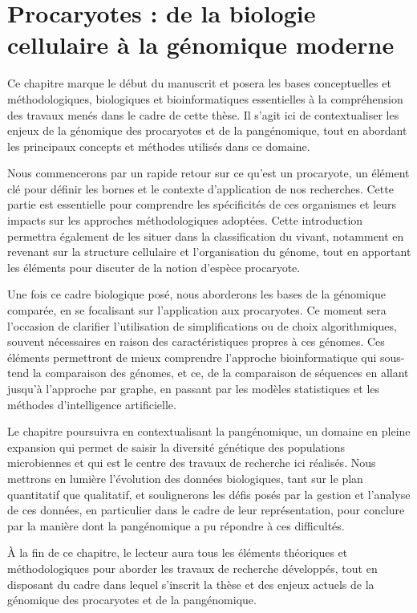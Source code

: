 \part{Procaryotes : de la biologie cellulaire à la génomique moderne}

Ce chapitre marque le début du manuscrit et posera les bases conceptuelles et méthodologiques, biologiques et bioinformatiques essentielles à la compréhension des travaux menés dans le cadre de cette thèse. Il s’agit ici de contextualiser les enjeux de la génomique des procaryotes et de la pangénomique, tout en abordant les principaux concepts et méthodes utilisés dans ce domaine.

Nous commencerons par un rapide retour sur ce qu'est un procaryote, un élément clé pour définir les bornes et le contexte d’application de nos recherches. Cette partie est essentielle pour comprendre les spécificités de ces organismes et leurs impacts sur les approches méthodologiques adoptées. Cette introduction permettra également de les situer dans la classification du vivant, notamment en revenant sur la structure cellulaire et l'organisation du génome, tout en apportant les éléments pour discuter de la notion d'espèce procaryote.

Une fois ce cadre biologique posé, nous aborderons les bases de la génomique comparée, en se focalisant sur l'application aux procaryotes. Ce moment sera l’occasion de clarifier l’utilisation de simplifications ou de choix algorithmiques, souvent nécessaires en raison des caractéristiques propres à ces génomes. Ces éléments permettront de mieux comprendre l’approche bioinformatique qui sous-tend la comparaison des génomes, et ce, de la comparaison de séquences en allant jusqu'à l'approche par graphe, en passant par les modèles statistiques et les méthodes d'intelligence artificielle.

Le chapitre poursuivra en contextualisant la pangénomique, un domaine en pleine expansion qui permet de saisir la diversité génétique des populations microbiennes et qui est le centre des travaux de recherche ici réalisés. Nous mettrons en lumière l’évolution des données biologiques, tant sur le plan quantitatif que qualitatif, et soulignerons les défis posés par la gestion et l’analyse de ces données, en particulier dans le cadre de leur représentation, pour conclure par la manière dont la pangénomique a pu répondre à ces difficultés.

À la fin de ce chapitre, le lecteur aura tous les éléments théoriques et méthodologiques pour aborder les travaux de recherche développés, tout en disposant du cadre dans lequel s'inscrit la thèse et des enjeux actuels de la génomique des procaryotes et de la pangénomique.




